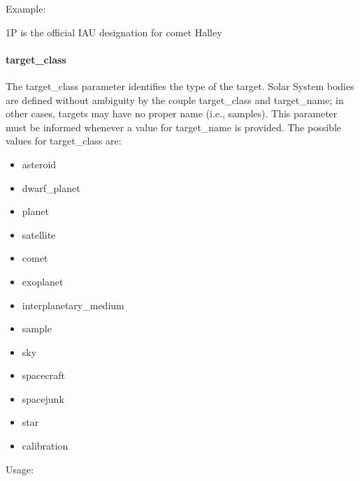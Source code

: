 \documentclass[11pt,a4paper]{ivoa}
\begin{document}
Example:

1P is the official IAU designation for comet Halley

\paragraph{target\_class}

The target\_class parameter identifies the type of the target. Solar System bodies are defined without ambiguity by the couple target\_class and target\_name; in other cases, targets may have no proper name (i.e., samples).  This parameter must be informed whenever a value for target\_name is provided. The possible values for target\_class are:

\begin{itemize}

\item asteroid

\item dwarf\_planet

\item planet

\item satellite

\item comet

\item exoplanet

\item interplanetary\_medium

\item sample

\item sky

\item spacecraft

\item spacejunk

\item star

\item calibration

\end{itemize}

Usage:
\end{document}
